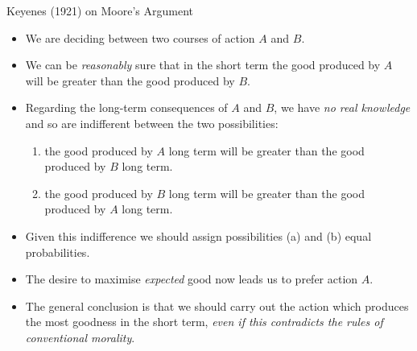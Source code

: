 \documentclass[usenames,dvipsnames, 10pt]{beamer}
\begin{document}
\begin{frame}{Keyenes (1921) on Moore's Argument}
	\begin{itemize}
		\item We are deciding between two courses of action $A$ and $B$.
		\pause
		\item
		 We can be \emph{reasonably} sure that in the short
		term the good produced by $A$ will be greater than the good produced by $B$. 
		\pause
		\item
		Regarding
		the long-term consequences of $A$ and $B$, we have \emph{no real knowledge} and so are
		indifferent between the two possibilities: 
		\begin{enumerate}
			\item[(a)] the good produced by $A$ long term
			will be greater than the good produced by $B$ long term.
			\item [(b)]	 the good produced	by $B$ long term will be greater than the good produced by $A$ long term.
		\end{enumerate}
		\pause
		\item Given this indifference we should assign possibilities (a) and (b) equal probabilities. 
		
		\pause
		\item The	desire to maximise \emph{expected} good now leads us to prefer action $A$. 
		\pause
		\item The general conclusion is that we should carry out the action which produces the most goodness	in the short term, \emph{even if this contradicts the rules of conventional morality}.
	\end{itemize}
\end{frame}
\end{document}
